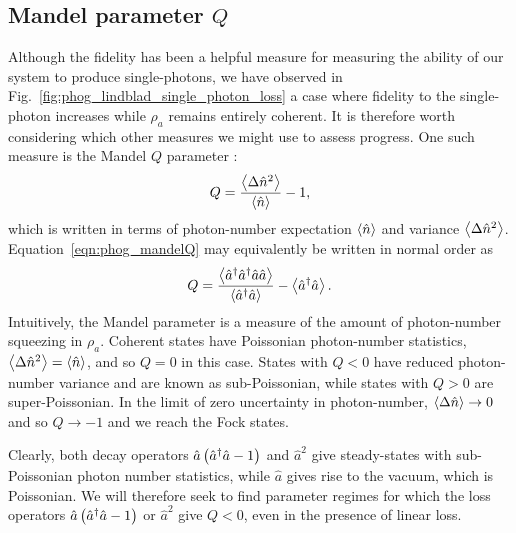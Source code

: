 \subsection{Mandel parameter $Q$}
Although the fidelity has been a helpful measure for measuring the ability of our system to produce single-photons, we have observed in Fig.~\ref{fig:phog_lindblad_single_photon_loss} a case where fidelity to the single-photon increases while $\rho_a$ remains entirely coherent. It is therefore worth considering which other measures we might use to assess progress. One such measure is the Mandel $Q$ parameter \cite{Mandel1979, Carmichael1999, Davidovich1996}:
\begin{equation}\label{eqn:phog_mandelQ}
Q = \frac{\ev{\Delta\hat{n}^2}}{\ev{\hat{n}}} - 1,
\end{equation}
which is written in terms of photon-number expectation $\ev{\hat{n}}$ and variance $\ev{\Delta\hat{n}^2}$. Equation~\ref{eqn:phog_mandelQ} may equivalently be written in normal order as 
\begin{equation}
Q = \frac{\ev{\hat{a}^\dagger \hat{a}^\dagger \hat{a}\hat{a}}}{\ev{\hat{a}^\dagger \hat{a}}} - \ev{\hat{a}^\dagger \hat{a}}.
\end{equation}
Intuitively, the Mandel parameter is a measure of the amount of photon-number squeezing in $\rho_a$. Coherent states have Poissonian photon-number statistics, $\ev{\Delta\hat{n}^2} = \ev{\hat{n}}$, and so $Q = 0$ in this case. States with $Q < 0$ have reduced photon-number variance and are known as sub-Poissonian, while states with $Q > 0$ are super-Poissonian. In the limit of zero uncertainty in photon-number, $\ev{\Delta\hat{n}} \rightarrow 0$ and so $Q \rightarrow -1$ and we reach the Fock states.

Clearly, both decay operators $\hat{a}\left(\hat{a}^\dagger \hat{a} - 1\right)$ and $\hat{a}^2$ give steady-states with sub-Poissonian photon number statistics, while $\hat{a}$ gives rise to the vacuum, which is Poissonian. We will therefore seek to find parameter regimes for which the loss operators $\hat{a}\left(\hat{a}^\dagger \hat{a} - 1\right)$ or $\hat{a}^2$ give $Q<0$, even in the presence of linear loss.



